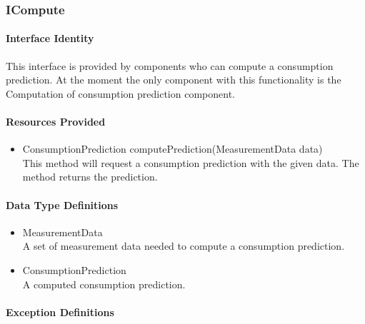 \subsubsection{ICompute}
\paragraph{Interface Identity}
This interface is provided by components who can compute a
	consumption prediction. At the moment the only component
	with this functionality is the Computation of consumption
	prediction component.
\paragraph{Resources Provided}
\begin{itemize}
	\item{ConsumptionPrediction computePrediction(MeasurementData data)}\\
	This method will request a consumption prediction with the given data.
		The method returns the prediction.
\end{itemize}
\paragraph{Data Type Definitions}
\begin{itemize}
	\item MeasurementData\\
	A set of measurement data needed to compute a consumption prediction.
	\item ConsumptionPrediction\\
	A computed consumption prediction.
\end{itemize}
\paragraph{Exception Definitions}
